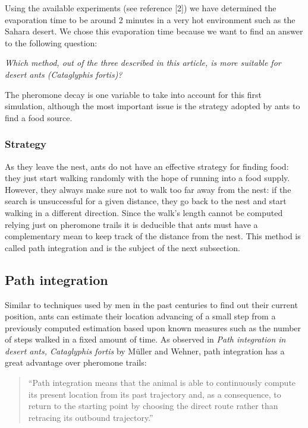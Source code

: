 \documentclass[11pt]{article}
\begin{document}
Using the available experiments (see reference [2]) we have determined the evaporation time to be around 2 minutes in a very hot environment such as the Sahara desert. We chose this evaporation time because we want to find an answer to the following question:
\begin{center}
\emph{Which method, out of the three described in this article, is more suitable for desert ants (Cataglyphis fortis)?}
\end{center}

The pheromone decay is one variable to take into account for this first simulation, although the most important issue is the strategy adopted by ants to find a food source.

\subsubsection{Strategy}
As they leave the nest, ants do not have an effective strategy for finding food: they just start walking randomly with the hope of running into a food supply. However, they always make sure not to walk too far away from the nest: if the search is unsuccessful for a given distance, they go back to the nest and start walking in a different direction. Since the walk's length cannot be computed relying just on pheromone trails it is deducible that ants must have a complementary mean to keep track of the distance from the nest. This method is called path integration and is the subject of the next subsection.

\subsection{Path integration}

Similar to techniques used by men in the past centuries to find out their current position, ants can estimate their location advancing of a small step from a previously computed estimation based upon known measures such as the number of steps walked in a fixed amount of time. As observed in \emph{Path integration in desert ants, Cataglyphis fortis} by M\"{u}ller and Wehner, path integration has a great advantage over pheromone trails:
\begin{center}
	\begin{quotation}
		``Path integration means that the animal is able to continuously compute its present location from its past trajectory and, as
		a consequence, to return to the starting point by choosing the direct route rather than retracing its outbound trajectory.''
	\end{quotation}
\end{center}
\end{document}
